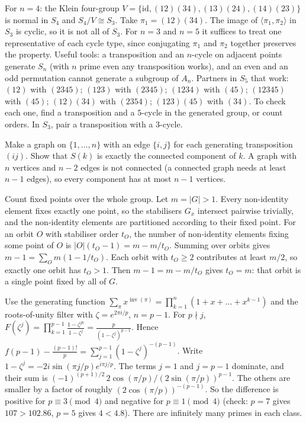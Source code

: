\documentclass[11pt,a4paper]{article}
\begin{document}

 For $n=4$: the Klein four-group $V=\{\mathrm{id},(12)(34),(13)(24),(14)(23)\}$ is normal in $S_4$ and $S_4/V\cong S_3$. Take $\pi_1=(12)(34)$. The image of $\langle\pi_1,\pi_2\rangle$ in $S_3$ is cyclic, so it is not all of $S_3$.
 For $n=3$ and $n=5$ it suffices to treat one representative of each cycle type, since conjugating $\pi_1$ and $\pi_2$ together preserves the property. Useful tools: a transposition and an $n$-cycle on adjacent points generate $S_n$ (with $n$ prime even any transposition works), and an even and an odd permutation cannot generate a subgroup of $A_n$.
 Partners in $S_5$ that work: $(12)$ with $(2345)$; $(123)$ with $(2345)$; $(1234)$ with $(45)$; $(12345)$ with $(45)$; $(12)(34)$ with $(2354)$; $(123)(45)$ with $(34)$. To check each one, find a transposition and a $5$-cycle in the generated group, or count orders. In $S_3$, pair a transposition with a $3$-cycle.

 Make a graph on $\{1,\dots,n\}$ with an edge $\{i,j\}$ for each generating transposition $(ij)$. Show that $S(k)$ is exactly the connected component of $k$.
 A graph with $n$ vertices and $n-2$ edges is not connected (a connected graph needs at least $n-1$ edges), so every component has at most $n-1$ vertices.

 Count fixed points over the whole group. Let $m=|G|>1$. Every non-identity element fixes exactly one point, so the stabilisers $G_x$ intersect pairwise trivially, and the non-identity elements are partitioned according to their fixed point.
 For an orbit $O$ with stabiliser order $t_O$, the number of non-identity elements fixing some point of $O$ is $|O|(t_O-1)=m-m/t_O$. Summing over orbits gives $m-1=\sum_O m(1-1/t_O)$.
 Each orbit with $t_O\ge2$ contributes at least $m/2$, so exactly one orbit has $t_O>1$. Then $m-1=m-m/t_O$ gives $t_O=m$: that orbit is a single point fixed by all of $G$.

 Use the generating function $\sum_\pi x^{\operatorname{inv}(\pi)}=\prod_{k=1}^n(1+x+\dots+x^{k-1})$ and the roots-of-unity filter with $\zeta=e^{2\pi i/p}$, $n=p-1$.
 For $p\nmid j$, $F(\zeta^j)=\prod_{k=1}^{p-1}\frac{1-\zeta^{jk}}{1-\zeta^j}=\frac{p}{(1-\zeta^j)^{p-1}}$. Hence $f(p-1)-\frac{(p-1)!}p=\sum_{j=1}^{p-1}(1-\zeta^j)^{-(p-1)}$.
 Write $1-\zeta^j=-2i\sin(\pi j/p)e^{i\pi j/p}$. The terms $j=1$ and $j=p-1$ dominate, and their sum is $(-1)^{(p+1)/2}\,2\cos(\pi/p)/(2\sin(\pi/p))^{p-1}$. The others are smaller by a factor of roughly $(2\cos(\pi/p))^{-(p-1)}$.
 So the difference is positive for $p\equiv3\pmod4$ and negative for $p\equiv1\pmod4$ (check: $p=7$ gives $107>102.86$, $p=5$ gives $4<4.8$). There are infinitely many primes in each class.
\end{document}
